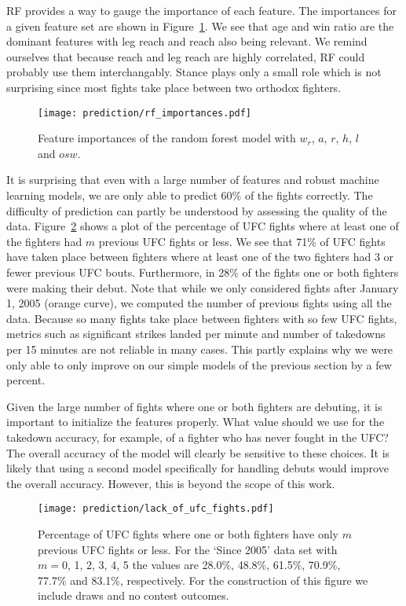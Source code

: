 RF provides a way to gauge the importance of
each feature. The importances for a given feature
set are shown in Figure~\ref{rf_importances}. We see that age
and win ratio are the dominant features with leg reach and reach
also being relevant. We remind ourselves that because reach and leg reach
are highly correlated, RF could probably use them interchangably. Stance
plays only a small role which is not surprising since most fights
take place between two orthodox fighters.

\begin{figure}[h]
\begin{center}
\texttt{[image: prediction/rf\_importances.pdf]}
\caption{Feature importances of the random forest model with $w_r$,
$a$, $r$, $h$, $l$ and $osw$.}
\label{rf_importances}
\end{center}
\end{figure}

It is surprising that even with a large number of features
and robust machine learning models, we are only able to
predict 60\% of the fights correctly. 
The difficulty of prediction can partly be understood by assessing the
quality of the data. Figure~\ref{lack_of_ufc_fights} shows
a plot of the percentage of UFC fights where at least one of the
fighters had $m$ previous UFC fights or less. We see that 71\% of UFC fights
have taken place between fighters where at least one of the two
fighters had 3 or fewer previous UFC
bouts. Furthermore, in 28\% of the fights one or both
fighters were making their debut.
Note that while we only considered fights after January 1, 2005 (orange curve),
we computed the number of previous fights using all the data. Because
so many fights take place between fighters with so few UFC fights,
metrics such as significant
strikes landed per minute and number of takedowns per 15 minutes
are not reliable in many cases.
This partly explains why we were only able to only improve on
our simple models of the previous section by a few percent.

Given the large number of fights where one or both fighters
are debuting, it is important to initialize the features properly.
What value should we use for the takedown accuracy, for example, of a
fighter who has never fought in the UFC?
The overall accuracy of the model
will clearly be sensitive to these choices. It is likely that
using a second model specifically for handling debuts would improve
the overall accuracy. However, this is beyond the scope of this
work.

\begin{figure}[h]
\begin{center}
\texttt{[image: prediction/lack\_of\_ufc\_fights.pdf]}
\caption{Percentage of UFC fights where one or both fighters
have only $m$ previous UFC fights or less. For the
`Since 2005' data set with $m=0$, 1, 2, 3, 4, 5 the values are
28.0\%, 48.8\%, 61.5\%, 70.9\%, 77.7\% and 83.1\%, respectively.
For the construction of this figure we include draws and 
no contest outcomes.}
\label{lack_of_ufc_fights}
\end{center}
\end{figure}

